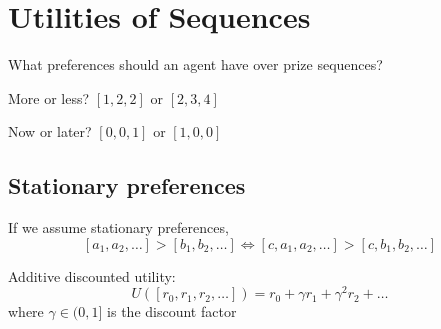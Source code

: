 \section{Utilities of Sequences}
What preferences should an agent have over prize sequences?

More or less? $[1,2,2]$ or  $[2,3,4]$

Now or later? $[0,0,1]$ or  $[1,0,0]$ 


\subsection{Stationary preferences}
If we assume stationary preferences, 
$$ [a_1,a_2,\dots] > [b_1,b_2,\dots] \iff [c,a_1,a_2,\dots] > [c, b_1, b_2 ,\dots] $$ 

Additive discounted utility:
$$ U([r_0,r_1,r_2,\dots]) = r_0 + \gamma r_1 + \gamma^2 r_2 + \dots $$ 
where $\gamma \in (0,1]$ is the discount factor


